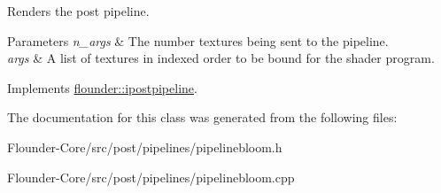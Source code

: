 Renders the post pipeline. 


\begin{DoxyParams}{Parameters}
{\em n\+\_\+args} & The number textures being sent to the pipeline. \\
\hline
{\em args} & A list of textures in indexed order to be bound for the shader program. \\
\hline
\end{DoxyParams}


Implements \hyperlink{classflounder_1_1ipostpipeline_a25255482fdb75f92b8c3f940ca8c583a}{flounder\+::ipostpipeline}.



The documentation for this class was generated from the following files\+:\begin{DoxyCompactItemize}
\item 
Flounder-\/\+Core/src/post/pipelines/pipelinebloom.\+h\item 
Flounder-\/\+Core/src/post/pipelines/pipelinebloom.\+cpp\end{DoxyCompactItemize}
